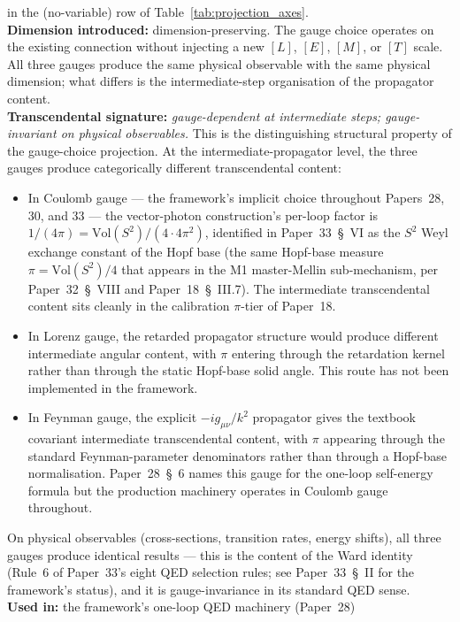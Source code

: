 \documentclass[11pt]{article}
\begin{document}
in the (no-variable) row of Table~\ref{tab:projection_axes}.\\
\textbf{Dimension introduced:} dimension-preserving.  The gauge choice
operates on the existing connection without injecting a new $[L]$,
$[E]$, $[M]$, or $[T]$ scale.  All three gauges produce the same
physical observable with the same physical dimension; what differs is
the intermediate-step organisation of the propagator content.\\
\textbf{Transcendental signature:} \emph{gauge-dependent at
intermediate steps; gauge-invariant on physical observables.}  This is
the distinguishing structural property of the gauge-choice projection.
At the intermediate-propagator level, the three gauges produce
categorically different transcendental content:
\begin{itemize}\setlength{\itemsep}{2pt}
\item In Coulomb gauge --- the framework's implicit choice throughout
Papers~28, 30, and 33 --- the vector-photon construction's per-loop
factor is $1/(4\pi) = \mathrm{Vol}(S^2)/(4 \cdot 4\pi^2)$, identified
in Paper~33~\S~VI as the $S^2$ Weyl exchange constant of the Hopf
base (the same Hopf-base measure $\pi = \mathrm{Vol}(S^2)/4$ that
appears in the M1 master-Mellin sub-mechanism, per Paper~32~\S~VIII
and Paper~18~\S~III.7).  The intermediate transcendental content sits
cleanly in the calibration $\pi$-tier of Paper~18.
\item In Lorenz gauge, the retarded propagator structure would produce
different intermediate angular content, with $\pi$ entering through
the retardation kernel rather than through the static Hopf-base solid
angle.  This route has not been implemented in the framework.
\item In Feynman gauge, the explicit $-i g_{\mu\nu}/k^2$ propagator
gives the textbook covariant intermediate transcendental content, with
$\pi$ appearing through the standard Feynman-parameter denominators
rather than through a Hopf-base normalisation.  Paper~28~\S~6 names
this gauge for the one-loop self-energy formula but the production
machinery operates in Coulomb gauge throughout.
\end{itemize}
On physical observables (cross-sections, transition rates, energy
shifts), all three gauges produce identical results --- this is the
content of the Ward identity (Rule~6 of Paper~33's eight QED selection
rules; see Paper~33~\S~II for the framework's status), and it is
gauge-invariance in its standard QED sense.\\
\textbf{Used in:} the framework's one-loop QED machinery (Paper~28)
\end{document}
